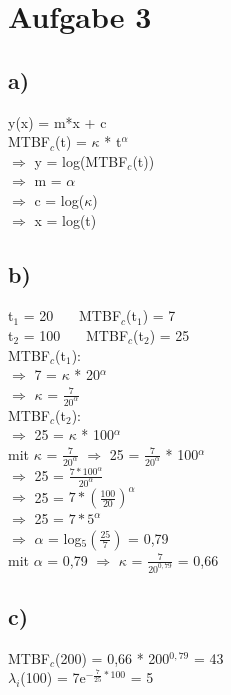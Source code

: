 \section*{Aufgabe 3}
	\subsection*{a)}
		y(x) = m*x + c\\
		MTBF$_c$(t) = $\kappa$ * t$^\alpha$\\
		$\Rightarrow$ y = log(MTBF$_c$(t))\\
		$\Rightarrow$ m = $\alpha$\\
		$\Rightarrow$ c = log($\kappa$)\\
		$\Rightarrow$ x = log(t)\\
		
	\subsection*{b)}
		t$_1$ = 20 \ \ \ MTBF$_c$(t$_1$) = 7 \\
		t$_2$ = 100 \ \ \ MTBF$_c$(t$_2$) = 25 \\
		
		MTBF$_c$(t$_1$):\\
		$\Rightarrow$ 7 = $\kappa$ * 20$^\alpha$\\
		$\Rightarrow$ $\kappa$ = $\frac{7}{20^\alpha}$\\
		
		MTBF$_c$(t$_2$):\\
		$\Rightarrow$ 25 = $\kappa$ * 100$^\alpha$\\
		mit $\kappa$ = $\frac{7}{20^\alpha}$ $\Rightarrow$ 25 = $\frac{7}{20^\alpha}$ * 100$^\alpha$\\
		$\Rightarrow$ 25 = $\frac{7 * 100^\alpha}{20^\alpha}$\\
		$\Rightarrow$ 25 = $7 * (\frac{100}{20})^\alpha$\\
		$\Rightarrow$ 25 = $7 * 5^\alpha$\\
		$\Rightarrow$ $\alpha$ = log$_5(\frac{25}{7})$ = 0,79\\
		mit $\alpha$ = 0,79 $\Rightarrow$ $\kappa$ = $\frac{7}{20^{0,79}}$ = 0,66\\
		
	\subsection*{c)}
		MTBF$_c$(200) = 0,66 * 200$^{0,79}$ = 43\\
		$\lambda_i$(100) = 7e$^{-\frac{7}{25} *100}$ = 5